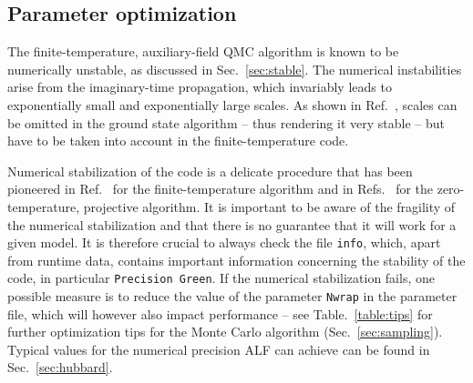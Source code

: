 %
\subsection{Parameter optimization} \label{sec:optimize}
%


The finite-temperature, auxiliary-field QMC algorithm is known to be numerically unstable, as discussed in Sec.~\ref{sec:stable}.
The numerical instabilities arise from the imaginary-time propagation, which invariably leads to exponentially small and exponentially large scales.
As shown in Ref.~\cite{Assaad08_rev}, scales can be omitted in the ground state algorithm -- thus rendering it very stable --  but have to be taken into account in the  finite-temperature code.

Numerical stabilization of the code is a delicate procedure that has been pioneered in Ref.~\cite{White89}  for the finite-temperature algorithm and in Refs.~\cite{Sugiyama86,Sorella89} for the zero-temperature, projective algorithm.
It is important to be aware of the fragility of the numerical stabilization and that there is no guarantee that it will work for a given model. It is therefore crucial to always check the file \texttt{info}, which, apart from runtime data, contains important information concerning the stability of the code, in particular \texttt{Precision Green}.
If the numerical stabilization fails, one possible measure is to reduce the value of the parameter \texttt{Nwrap} in the parameter file, which will however also impact performance -- see Table.~\ref{table:tips} for further optimization tips for the Monte Carlo algorithm (Sec.~\ref{sec:sampling}). Typical values for the numerical precision ALF can achieve can be found in Sec.~\ref{sec:hubbard}.

